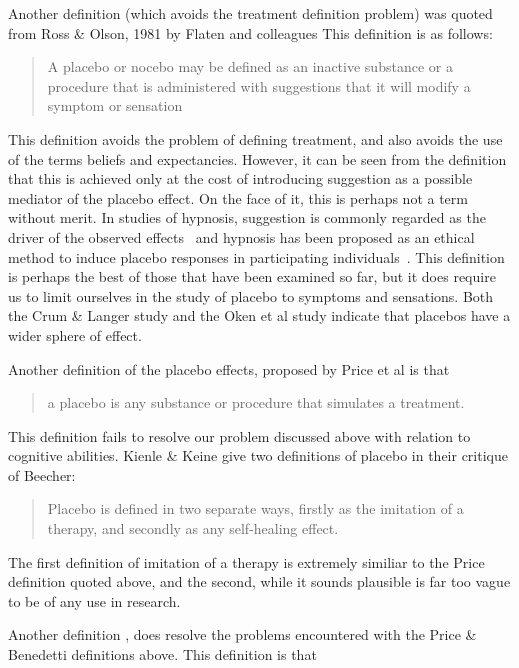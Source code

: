 Another definition (which avoids the treatment definition problem) was quoted from Ross \& Olson, 1981 by Flaten and colleagues \cite{Flaten1999}
This definition is as follows:

\begin{quotation}
  A placebo or nocebo may be defined as an inactive
substance or a procedure that is administered with
suggestions that it will modify a symptom or sensation
\end{quotation}

This definition avoids the problem of defining treatment, and also avoids the use of the terms beliefs and expectancies. However, it can be seen from the definition that this is achieved only at the cost of introducing suggestion as a possible mediator of the placebo effect. On the face of it, this is perhaps not a term without merit. In studies of hypnosis, suggestion is commonly regarded as the driver of the observed effects~\cite{Kirsch1994} and hypnosis has been proposed as an ethical method to induce placebo responses in participating individuals~\cite{Raz2007a}. This definition is perhaps the best of those that have been examined so far, but it does require us to limit ourselves in the study of placebo to symptoms and sensations. Both the Crum \& Langer study and the Oken et al study indicate that placebos have a wider sphere of effect. 


Another definition of the placebo effects,  proposed by Price et al \cite{Price2008} is that

\begin{quotation}
  a placebo is any substance or procedure that simulates a treatment.
\end{quotation}

This definition fails to resolve our problem discussed above with relation to cognitive abilities. 
Kienle \& Keine give two definitions of placebo in their critique of Beecher:

\begin{quotation}
Placebo is defined in two separate ways, firstly as the imitation of a
therapy, and secondly as any self-healing effect. 
\end{quotation}

The first definition of imitation of a therapy is extremely similiar to the Price definition quoted above, and the second, while it sounds plausible is far too vague to be of any use in research.

Another definition \cite{Blasi2001}, does resolve the problems encountered with the Price \& Benedetti  definitions above. This definition is that

